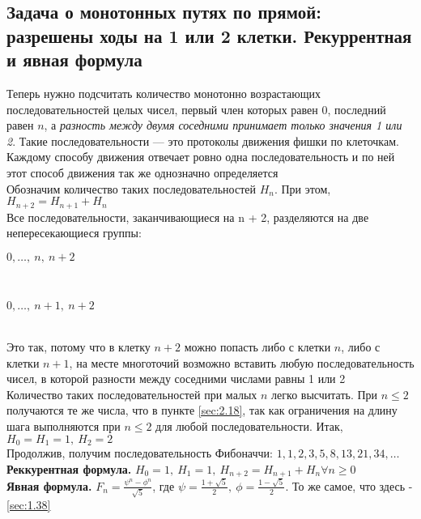 \documentclass[a4paper]{article}
\begin{document}
\subsection{Задача о монотонных путях по прямой: разрешены ходы на 1 или 2 клетки. Рекуррентная и явная формула}
Теперь нужно подсчитать количество монотонно возрастающих последовательностей целых чисел, первый член которых равен 0, последний равен $n$, а \textit{разность между двумя соседними принимает только значения 1 или 2}. Такие последовательности — это протоколы движения фишки по клеточкам. Каждому способу движения отвечает ровно одна последовательность и по ней этот способ движения так же однозначно определяется\\[2mm]
 Обозначим количество таких последовательностей $H_n$. При этом, $H_{n+2}=H_{n+1}+H_n$\\[2mm]
 Все последовательности, заканчивающиеся на n + 2, разделяются на две непересекающиеся группы:\\[2mm]
\centerline{$0,\ldots,\ n,\ n+2$}\\[2mm]
\centerline{$0,\ldots,\ n+1,\ n+2$}\\[2mm]
 Это так, потому что в клетку $n+2$ можно попасть либо с клетки $n$, либо с клетки $n+1$, на месте многоточий возможно вставить любую последовательность чисел, в которой разности между соседними числами равны 1 или 2\\[2mm]
 Количество таких последовательностей при малых $n$ легко высчитать. При $n\leqslant2$ получаются те же числа, что в пункте \ref{sec:2.18}, так как ограничения на длину шага выполняются при $n\leqslant2$ для любой последовательности. Итак, $H_0=H_1=1,\ H_2=2$\\[2mm]
 Продолжив, получим последовательность Фибоначчи: $1, 1, 2, 3, 5, 8, 13, 21, 34,\ldots$\\[2mm]
\textbf{Реккурентная формула.} $H_0=1,\ H_1=1,\ H_{n+2}=H_{n+1}+H_n\forall n\geqslant0$\\[2mm]
\textbf{Явная формула.} $F_n=\frac{\psi^n-\phi^n}{\sqrt{5}}$, где $\psi=\frac{1+\sqrt{5}}{2},\ \phi=\frac{1-\sqrt{5}}{2}$. То же самое, что здесь - \ref{sec:1.38}
\end{document}
